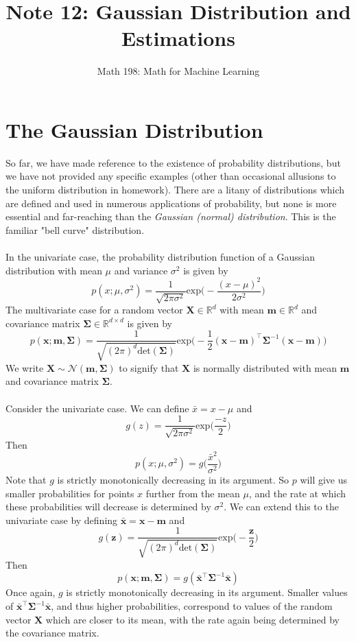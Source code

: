 \documentclass{article}
\title{Note 12: Gaussian Distribution and Estimations}
\author{Math 198: Math for Machine Learning}
\date{}
\begin{document}
\maketitle

\section{The Gaussian Distribution}
So far, we have made reference to the existence of probability distributions, but we have not provided any specific examples (other than occasional allusions to the uniform distribution in homework). There are a litany of distributions which are defined and used in numerous applications of probability, but none is more essential and far-reaching than the \textit{Gaussian (normal) distribution}. This is the familiar "bell curve" distribution. \\\\
In the univariate case, the probability distribution function of a Gaussian distribution with mean $\mu$ and variance $\sigma^2$ is given by
$$p(x;\mu, \sigma^2) = \frac{1}{\sqrt{2\pi\sigma^2}}\text{exp}\big(-\frac{(x - \mu)^2}{2\sigma^2} \big)$$
The multivariate case for a random vector $\mathbf{X} \in \mathbb{R}^d$ with mean $\mathbf{m} \in \mathbb{R}^d$ and covariance matrix $\mathbf{\Sigma} \in \mathbb{R}^{d \times d}$ is given by
$$p(\mathbf{x};\mathbf{m},\mathbf{\Sigma}) = \frac{1}{\sqrt{(2\pi)^d\text{det}(\mathbf{\Sigma})}}\text{exp}\big(-\frac{1}{2}(\mathbf{x - m})^\top\mathbf{\Sigma}^{-1}(\mathbf{x - m}) \big)$$
We write $\mathbf{X} \sim \mathcal{N}(\mathbf{m, \Sigma})$ to signify that $\mathbf{X}$ is normally distributed with mean $\mathbf{m}$ and covariance matrix $\mathbf{\Sigma}$. \\\\
Consider the univariate case. We can define $\bar{x} = x - \mu$ and
$$g(z) = \frac{1}{\sqrt{2\pi\sigma^2}}\text{exp}\big(\frac{-z}{2} \big)$$
Then $$p(x;\mu, \sigma^2) = g\big(\frac{\bar{x}^2}{\sigma^2} \big)$$
Note that $g$ is strictly monotonically decreasing in its argument. So $p$ will give us smaller probabilities for points $x$ further from the mean $\mu$, and the rate at which these probabilities will decrease is determined by $\sigma^2$. We can extend this to the univariate case by defining $\mathbf{\bar{x}} = \mathbf{x - m}$ and
$$g(\mathbf{z}) = \frac{1}{\sqrt{(2\pi)^d\text{det}(\mathbf{\Sigma})}}\text{exp}\big(-\frac{\mathbf{z}}{2} \big)$$
Then
$$p(\mathbf{x;m,\Sigma}) = g(\mathbf{\bar{x}}^\top\mathbf{\Sigma}^{-1}\bar{\mathbf{x}})$$
Once again, $g$ is strictly monotonically decreasing in its argument. Smaller values of $\mathbf{\bar{x}}^\top\mathbf{\Sigma}^{-1}\bar{\mathbf{x}}$, and thus higher probabilities, correspond to values of the random vector $\mathbf{X}$ which are closer to its mean, with the rate again being determined by the covariance matrix.
\end{document}
